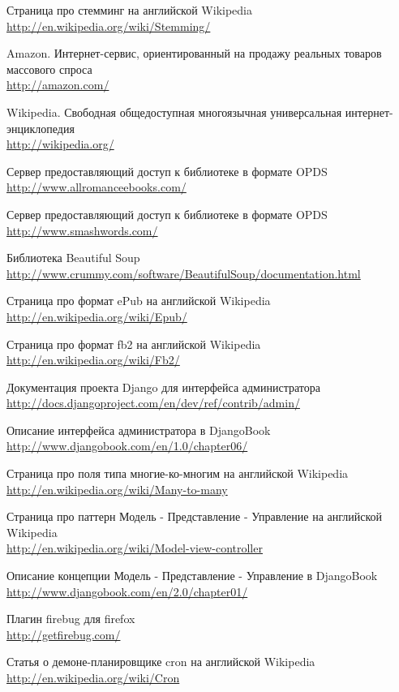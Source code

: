 \begin{thebibliography}{99}
 Страница про стемминг на английской Wikipedia\\ \url{http://en.wikipedia.org/wiki/Stemming/}

 Amazon. Интернет-сервис, ориентированный на продажу реальных товаров массового спроса \\ \url{http://amazon.com/}

 Wikipedia. Свободная общедоступная многоязычная универсальная интернет-энциклопедия \\ \url{http://wikipedia.org/}

 Сервер предоставляющий доступ к библиотеке в формате OPDS \\
\url{http://www.allromanceebooks.com/}

 Сервер предоставляющий доступ к библиотеке в формате OPDS \\
\url{http://www.smashwords.com/}

 Библиотека Beautiful Soup \\ \url{http://www.crummy.com/software/BeautifulSoup/documentation.html}

 Страница про формат ePub на английской Wikipedia\\ \url{http://en.wikipedia.org/wiki/Epub/}

 Страница про формат fb2 на английской Wikipedia\\ \url{http://en.wikipedia.org/wiki/Fb2/}

 Документация проекта Django для интерфейса администратора\\ \url{http://docs.djangoproject.com/en/dev/ref/contrib/admin/}

 Описание интерфейса администратора в DjangoBook\\ \url{http://www.djangobook.com/en/1.0/chapter06/}

 Страница про поля типа многие-ко-многим на английской Wikipedia\\ \url{http://en.wikipedia.org/wiki/Many-to-many}

 Страница про паттерн Модель - Представление - Управление на английской Wikipedia\\
\url{http://en.wikipedia.org/wiki/Model-view-controller}

 Описание концепции Модель - Представление - Управление в DjangoBook \\
\url{http://www.djangobook.com/en/2.0/chapter01/}

 Плагин firebug для firefox \\
\url{http://getfirebug.com/}

 Статья о демоне-планировщике cron на английской Wikipedia \\
\url{http://en.wikipedia.org/wiki/Cron}


\end{thebibliography}
